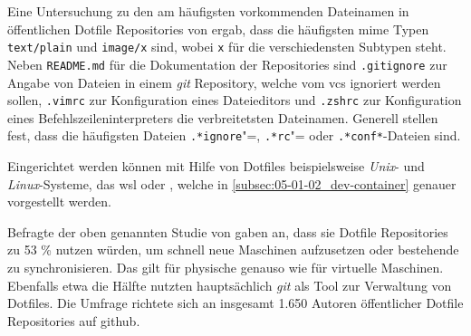 Eine Untersuchung zu den am häufigsten vorkommenden Dateinamen in öffentlichen Dotfile Repositories von \citeauthor{029:Connecting-the-Dotfiles} ergab, dass die häufigsten \Gls{mime} Typen \texttt{text/plain} und \texttt{image/x} sind, wobei \texttt{x} für die verschiedensten Subtypen steht. Neben \texttt{README.md} für die Dokumentation der Repositories sind \texttt{.gitignore} zur Angabe von Dateien in einem \textit{\Gls{git}} Repository, welche vom \Gls{vcs} ignoriert werden sollen, \texttt{.vimrc} zur Konfiguration eines Dateieditors und \texttt{.zshrc} zur Konfiguration eines Befehlszeileninterpreters die verbreitetsten Dateinamen. Generell stellen \citeauthor{029:Connecting-the-Dotfiles} fest, dass die häufigsten Dateien \texttt{.*ignore}"=, \texttt{.*rc}"= oder \texttt{.*conf*}-Dateien sind. \cite{029:Connecting-the-Dotfiles}

Eingerichtet werden können mit Hilfe von Dotfiles beispielsweise \textit{Unix}- und \textit{Linux}-Systeme, das \Gls{wsl} oder  \cite{203:Dev-Environment-as-a-Code-with-DevContainers-Dotfiles-and-GitHub-Codespaces}, welche in \autoref{subsec:05-01-02_dev-container} genauer vorgestellt werden.

Befragte der oben genannten Studie von \citeauthor{029:Connecting-the-Dotfiles} gaben an, dass sie Dotfile Repositories zu 53 \% nutzen würden, um schnell neue Maschinen aufzusetzen oder bestehende zu synchronisieren. Das gilt für physische genauso wie für virtuelle Maschinen. Ebenfalls etwa die Hälfte nutzten hauptsächlich \textit{\Gls{git}} als Tool zur Verwaltung von Dotfiles. Die Umfrage richtete sich an insgesamt 1.650 Autoren öffentlicher Dotfile Repositories auf \Gls{github}. \cite{029:Connecting-the-Dotfiles}
